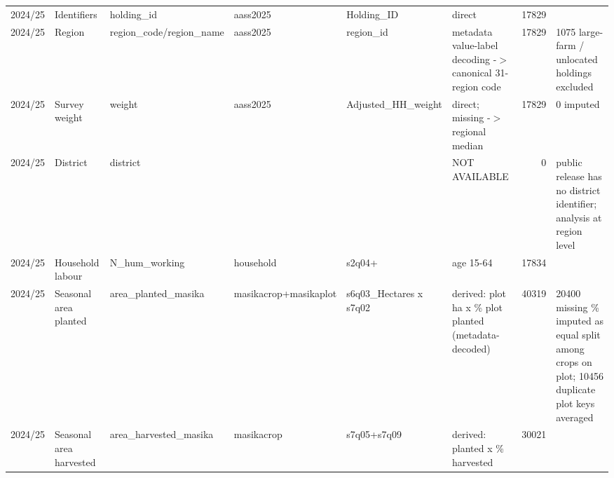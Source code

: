 \begin{tabular}{llllllrl}
 2024/25         & Identifiers               & holding\_id                & aass2025                         & Holding\_ID                                & direct                                                                                                       &   17829 &                                                                                                \\
 2024/25         & Region                    & region\_code/region\_name   & aass2025                         & region\_id                                 & metadata value-label decoding -\ensuremath{>} canonical 31-region code                                                    &   17829 & 1075 large-farm / unlocated holdings excluded                                                  \\
 2024/25         & Survey weight             & weight                    & aass2025                         & Adjusted\_HH\_weight                        & direct; missing -\ensuremath{>} regional median                                                                           &   17829 & 0 imputed                                                                                      \\
 2024/25         & District                  & district                  &                                  &                                           & NOT AVAILABLE                                                                                                &       0 & public release has no district identifier; analysis at region level                            \\
 2024/25         & Household labour          & N\_hum\_working             & household                        & s2q04+                                    & age 15-64                                                                                                    &   17834 &                                                                                                \\
 2024/25         & Seasonal area planted     & area\_planted\_masika       & masikacrop+masikaplot            & s6q03\_Hectares x s7q02                    & derived: plot ha x \% plot planted (metadata-decoded)                                                         &   40319 & 20400 missing \% imputed as equal split among crops on plot; 10456 duplicate plot keys averaged \\
 2024/25         & Seasonal area harvested   & area\_harvested\_masika     & masikacrop                       & s7q05+s7q09                               & derived: planted x \% harvested                                                                               &   30021 &                                                                                                \\

\end{tabular}
